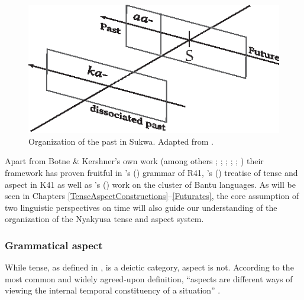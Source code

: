 \begin{figure}[hbt]
\begin{center}
\includegraphics{figures/GrafikSukwaTenorTenseNew.eps}
\caption{Organization of the past in Sukwa. Adapted from \citet[113]{KershnerT2002}.}
\label{FigureSukwaTenorTense}
\end{center}
\end{figure}

Apart from Botne \& Kershner's own work (among others \citealt{BotneR2003b}; \citeyear{BotneR2006}; \citeyear{BotneR2008}; \citealt{BotneRKershnerT2000}; \citeyear{BotneRKershnerT2008}; \citealt{KershnerT2002}) their framework has proven fruitful in \citeauthor{SeidelF2008}'s (\citeyear{SeidelF2008}) grammar of  R41, \citeauthor{CraneTM2011}'s (\citeyear{CraneTM2011}) treatise of tense and aspect in  K41 as well as \citeauthor{DomSBostoenK2015}'s (\citeyear{DomSBostoenK2015}) work on the  cluster of Bantu languages. As will be seen in Chapters \ref{TenseAspectConstructions}--\ref{Futurates}, the core assumption of two linguistic perspectives on time will also guide our understanding of the organization of the Nyakyusa tense and aspect system.

 
\subsubsection{Grammatical aspect}\label{Aspect}
While tense, as defined in , is a deictic category, aspect is not. According to the most common and widely agreed-upon definition, ``aspects are different ways of viewing the internal temporal constituency of a situation'' \mbox{\citep[3]{ComrieB1976}.}


